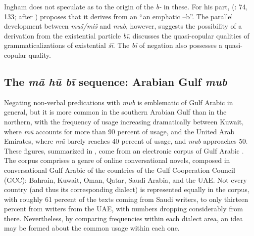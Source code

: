 \documentclass[output=paper]{langsci/langscibook}
\begin{document}
Ingham does not speculate as to the origin of the \textit{b-} in these. For his part, \citeauthor{binturki2015a} (\citeyear{binturki2015a}: 74, 133; after \citealp{matar1976a}) proposes that it derives from an “an emphatic –b”. The parallel development between \textit{muš/miš} and \textit{mub}, however, suggests the possibility of a derivation from the existential particle \textit{bī}. \citet[288--289]{wilmsen2017a} discusses the quasi-copular qualities of grammaticalizations of existential \textit{šī}. The \textit{bī} of negation also possesses a quasi-copular quality.

\subsection{The \textit{mā hū bī} sequence: Arabian Gulf \textit{mub}} \label{s:WiAR-4.5}

Negating non-verbal predications with \textit{mub} is emblematic of Gulf Arabic in general, but it is more common in the southern Arabian Gulf than in the northern, with the frequency of usage increasing dramatically between Kuwait, where \textit{mū} accounts for more than 90 percent of usage, and the United Arab Emirates, where \textit{mū} barely reaches 40 percent of usage, and \textit{mub} approaches 50. These figures, summarized in , come from an electronic corpus of Gulf Arabic \citep{khalifa2016a}. The corpus comprises a genre of online conversational novels, composed in conversational Gulf Arabic of the countries of the Gulf Cooperation Council (GCC): Bahrain, Kuwait, Oman, Qatar, Saudi Arabia, and the UAE. Not every country (and thus its corresponding dialect) is represented equally in the corpus, with roughly 61 percent of the texts coming from Saudi writers, to only thirteen percent from writers from the UAE, with numbers dropping considerably from there. Nevertheless, by comparing frequencies within each dialect area, an idea may be formed about the common usage within each one.
\end{document}
